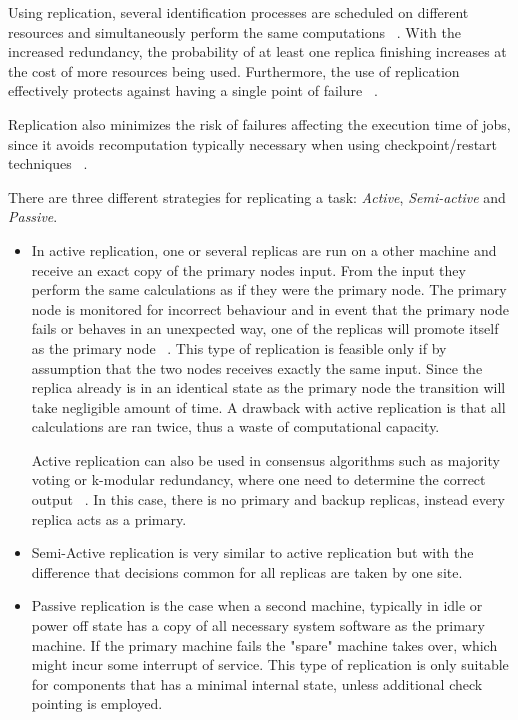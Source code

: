 \documentclass{cslthse-msc}
\begin{document}
Using replication, several identification processes are scheduled on different resources and simultaneously perform the same computations ~\cite{relGridSystems}. With the increased redundancy, the probability of at least one replica finishing increases at the cost of more resources being used. Furthermore, the use of replication effectively protects against having a single point of failure ~\cite{faultToleranceGrid}.

Replication also minimizes the risk of failures affecting the execution time of jobs, since it avoids recomputation typically necessary when using checkpoint/restart techniques ~\cite{designFaultTolerantSched}.

There are three different strategies for replicating a task: \emph{Active}, \emph{Semi-active} and \emph{Passive}.
\begin{itemize}

\item In active replication, one or several replicas are run on a other machine and receive an exact copy of the primary nodes input. From the input they perform the same calculations as if they were the primary node. The primary node is monitored for incorrect behaviour and in event that the primary node fails or behaves in an unexpected way, one of the replicas will promote itself as the primary node ~\cite{surveyFaultParallel}. This type of replication is feasible only if by assumption that the two nodes receives exactly the same input. Since the replica already is in an identical state as the primary node the transition will take negligible amount of time. A drawback with active replication is that all calculations are ran twice, thus a waste of computational capacity. 

Active replication can also be used in consensus algorithms such as majority voting or k-modular redundancy, where one need to determine the correct output ~\cite{surveyFaultParallel}. In this case, there is no primary and backup replicas, instead every replica acts as a primary.

\item Semi-Active replication is very similar to active replication but with the difference that decisions common for all replicas are taken by one site.

\item Passive replication is the case when a second machine, typically in idle or power off state has a copy of all necessary system software as the primary machine. If the primary machine fails the "spare" machine takes over, which might incur some interrupt of service. This type of replication is only suitable for components that has a minimal internal state, unless additional check pointing is employed.
\end{itemize}
\end{document}
